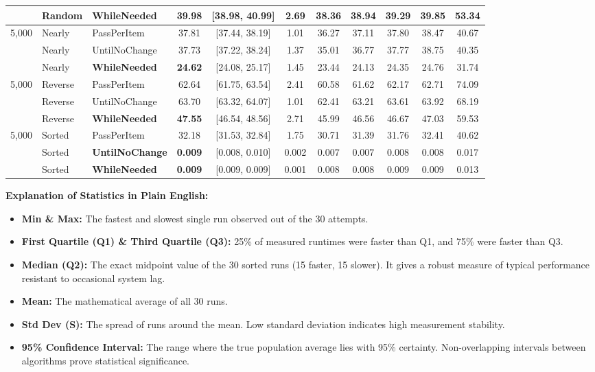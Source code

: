 \documentclass[10pt,a4paper]{article}
\begin{document}
\begin{center}
\begin{tabular}{|l|l|l|c|c|c|c|c|c|c|c|}
 & Random & \textbf{WhileNeeded} & \textbf{39.98} & [38.98, 40.99] & 2.69 & 38.36 & 38.94 & 39.29 & 39.85 & 53.34 \\
\hline
5,000 & Nearly & PassPerItem & 37.81 & [37.44, 38.19] & 1.01 & 36.27 & 37.11 & 37.80 & 38.47 & 40.67 \\
 & Nearly & UntilNoChange & 37.73 & [37.22, 38.24] & 1.37 & 35.01 & 36.77 & 37.77 & 38.75 & 40.35 \\
 & Nearly & \textbf{WhileNeeded} & \textbf{24.62} & [24.08, 25.17] & 1.45 & 23.44 & 24.13 & 24.35 & 24.76 & 31.74 \\
\hline
5,000 & Reverse & PassPerItem & 62.64 & [61.75, 63.54] & 2.41 & 60.58 & 61.62 & 62.17 & 62.71 & 74.09 \\
 & Reverse & UntilNoChange & 63.70 & [63.32, 64.07] & 1.01 & 62.41 & 63.21 & 63.61 & 63.92 & 68.19 \\
 & Reverse & \textbf{WhileNeeded} & \textbf{47.55} & [46.54, 48.56] & 2.71 & 45.99 & 46.56 & 46.67 & 47.03 & 59.53 \\
\hline
5,000 & Sorted & PassPerItem & 32.18 & [31.53, 32.84] & 1.75 & 30.71 & 31.39 & 31.76 & 32.41 & 40.62 \\
 & Sorted & \textbf{UntilNoChange} & \textbf{0.009} & [0.008, 0.010] & 0.002 & 0.007 & 0.007 & 0.008 & 0.008 & 0.017 \\
 & Sorted & \textbf{WhileNeeded} & \textbf{0.009} & [0.009, 0.009] & 0.001 & 0.008 & 0.008 & 0.009 & 0.009 & 0.013 \\
\hline
\end{tabular}
\end{center}

\vspace{0.4em}
\textbf{Explanation of Statistics in Plain English:}
\begin{itemize}
    \item \textbf{Min \& Max:} The fastest and slowest single run observed out of the 30 attempts.
    \item \textbf{First Quartile (Q1) \& Third Quartile (Q3):} 25\% of measured runtimes were faster than Q1, and 75\% were faster than Q3.
    \item \textbf{Median (Q2):} The exact midpoint value of the 30 sorted runs (15 faster, 15 slower). It gives a robust measure of typical performance resistant to occasional system lag.
    \item \textbf{Mean:} The mathematical average of all 30 runs.
    \item \textbf{Std Dev (S):} The spread of runs around the mean. Low standard deviation indicates high measurement stability.
    \item \textbf{95\% Confidence Interval:} The range where the true population average lies with 95\% certainty. Non-overlapping intervals between algorithms prove statistical significance.
\end{itemize}
\end{document}
